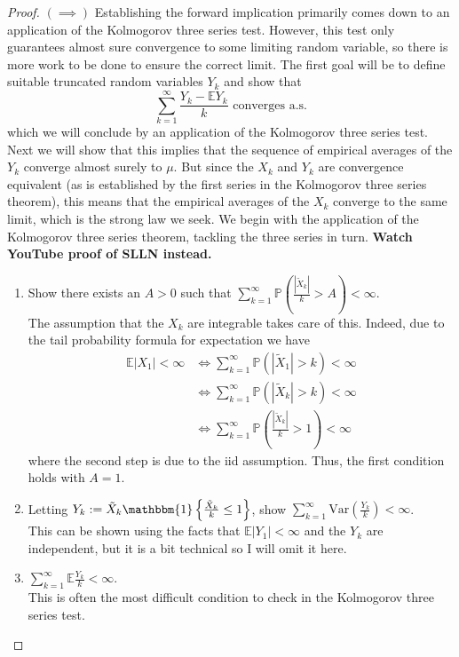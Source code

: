 \documentclass[12pt]{article}
\newcommand*{\abs}[1]{\left\lvert#1\right\rvert}
\newcommand{\E}{\mathbb{E}}
\newcommand{\Var}{\mathrm{Var}}
\newcommand{\Prob}{\mathbb{P}}
\begin{document}
\begin{proof}
$(\implies)$ Establishing the forward implication primarily comes down to an application of the Kolmogorov three series test. However, this test only guarantees almost sure convergence to some 
limiting random variable, so there is more work to be done to ensure the correct limit. The first goal will be to define suitable truncated random variables $Y_k$ and show that 
\[\sum_{k = 1}^{\infty} \frac{Y_k - \E Y_k}{k} \text{ converges a.s.}\]
which we will conclude by an application of the Kolmogorov three series test. Next we will show that this implies that the sequence of empirical averages of the $Y_k$ converge almost 
surely to $\mu$. But since the $X_k$ and $Y_k$ are convergence equivalent (as is established by the first series in the Kolmogorov three series theorem), this means that the 
empirical averages of the $X_k$ converge to the same limit, which is the strong law we seek. We begin with the application of the Kolmogorov three series theorem, tackling the three series
in turn. \textbf{Watch YouTube proof of SLLN instead.}
\begin{enumerate}
\item Show there exists an $A > 0$ such that $\sum_{k = 1}^{\infty} \Prob\left(\frac{\abs{\tilde{X}_k}}{k} > A \right) < \infty$. \\[.2cm]
The assumption that the $X_k$ are integrable takes care of this. Indeed, due to the tail probability formula for expectation we have 
\begin{align*}
\E\abs{X_1} < \infty &\iff \sum_{k = 1}^{\infty} \Prob(\abs{\tilde{X}_1} > k) < \infty \\
			      &\iff \sum_{k = 1}^{\infty} \Prob(\abs{\tilde{X}_k} > k) < \infty \\
			      &\iff \sum_{k = 1}^{\infty} \Prob\left(\frac{\abs{\tilde{X}_k}}{k} > 1 \right) < \infty
\end{align*}
where the second step is due to the iid assumption. Thus, the first condition holds with $A = 1$. 

\item Letting $Y_k := \tilde{X}_k \mathbbm{1}\left\{\frac{\tilde{X}_k}{k} \leq 1\right\}$, show $\sum_{k = 1}^{\infty} \Var\left(\frac{Y_k}{k}\right) < \infty$. \\[.2cm]
This can be shown using the facts that $\E \abs{Y_1} < \infty$ and the $Y_k$ are independent, but it is a bit technical so I will omit it here. 

\item  $\sum_{k = 1}^{\infty} \E \frac{Y_k}{k} < \infty$. \\[.2cm]
This is often the most difficult condition to check in the Kolmogorov three series test. 

\end{enumerate}
\end{proof}
\end{document}

